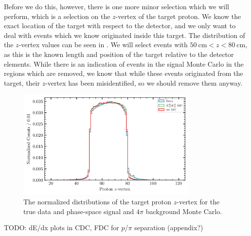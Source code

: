 Before we do this, however, there is one more minor selection which we will perform, which is a selection on the $z$-vertex of the target proton. We know the exact location of the target with respect to the detector, and we only want to deal with events which we know originated inside this target. The distribution of the $z$-vertex values can be seen in . We will select events with $\SI{50}{\centi\meter} < z < \SI{80}{\centi\meter}$, as this is the known length and position of the target relative to the detector elements. While there is an indication of events in the signal Monte Carlo in the regions which are removed, we know that while these events originated from the target, their $z$-vertex has been misidentified, so we should remove them anyway.


\begin{figure}
  \begin{center}
    \includegraphics[width=0.8\textwidth]{figures/data_original_combined_protonz.png}
  \end{center}
  \caption{The normalized distributions of the target proton $z$-vertex for the true data and phase-space signal and $4\pi$ background Monte Carlo.}\label{fig:data-original-combined-protonz}
\end{figure}

{\color{red}TODO: dE/dx plots in CDC, FDC for $p$/$\pi$ separation (appendix?)}


